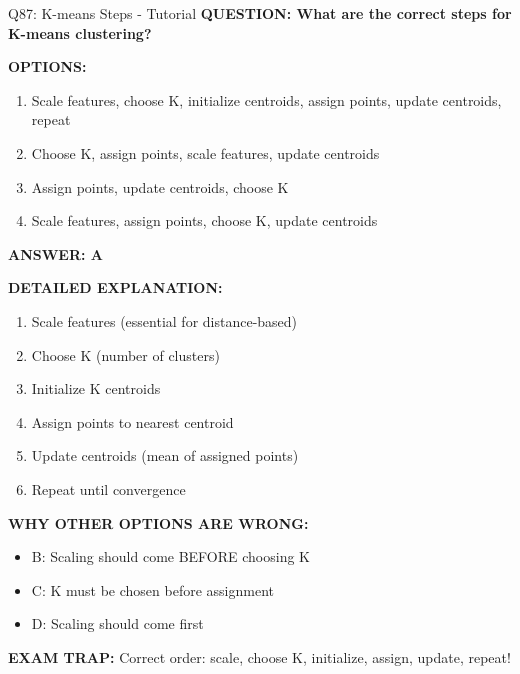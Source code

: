 \documentclass[8pt]{beamer}
\begin{document}
	\begin{frame}{Q87: K-means Steps - Tutorial}
		\fontsize{6.5}{7.5}\selectfont
		\textbf{QUESTION: What are the correct steps for K-means clustering?}
		
		\vspace{0.1cm}
		\textbf{OPTIONS:}
		\begin{enumerate}
			\item Scale features, choose K, initialize centroids, assign points, update centroids, repeat
			\item Choose K, assign points, scale features, update centroids
			\item Assign points, update centroids, choose K
			\item Scale features, assign points, choose K, update centroids
		\end{enumerate}
		
		\vspace{0.1cm}
		\textcolor{myblue}{\textbf{ANSWER: A}}
		
		\vspace{0.1cm}
		\textbf{DETAILED EXPLANATION:}
		\begin{enumerate}
			\item Scale features (essential for distance-based)
			\item Choose K (number of clusters)
			\item Initialize K centroids
			\item Assign points to nearest centroid
			\item Update centroids (mean of assigned points)
			\item Repeat until convergence
		\end{enumerate}
		
		\vspace{0.1cm}
		\textcolor{myred}{\textbf{WHY OTHER OPTIONS ARE WRONG:}}
		\begin{itemize}
			\item \textcolor{myred}{B:} Scaling should come BEFORE choosing K
			\item \textcolor{myred}{C:} K must be chosen before assignment
			\item \textcolor{myred}{D:} Scaling should come first
		\end{itemize}
		
		\textcolor{myred}{\textbf{EXAM TRAP:}} Correct order: \textcolor{myblue}{scale, choose K, initialize, assign, update, repeat}!
	\end{frame}
	
\end{document}
